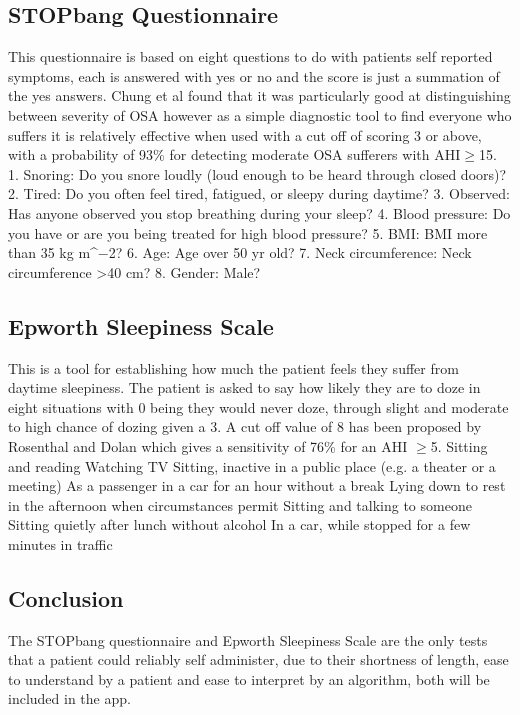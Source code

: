 \subsection{STOPbang Questionnaire}
This questionnaire is based on eight questions to do with patients self reported symptoms, each is answered with yes or no and the score is just a summation of the yes answers. Chung et al found that it was particularly good at distinguishing between severity of OSA however as a simple diagnostic tool to find everyone who suffers it is relatively effective when used with a cut off of scoring 3 or above, with a probability of 93\% for detecting moderate OSA sufferers with AHI$\geq$15.
1. Snoring: Do you snore loudly (loud enough to be heard through closed doors)?
2. Tired: Do you often feel tired, fatigued, or sleepy during daytime?
3. Observed: Has anyone observed you stop breathing during your sleep?
4. Blood pressure: Do you have or are you being treated for high blood pressure?
5. BMI: BMI more than 35 kg m^{−2}?
6. Age: Age over 50 yr old?
7. Neck circumference: Neck circumference >40 cm?
8. Gender: Male?

\subsection{Epworth Sleepiness Scale}
This is a tool for establishing how much the patient feels they suffer from daytime sleepiness. The patient is asked to say how likely they are to doze in eight situations with 0 being they would never doze, through slight and moderate to high chance of dozing given a 3. A cut off value of 8 has been proposed by Rosenthal and Dolan which gives a sensitivity of 76\% for an AHI $\geq$5. 
Sitting and reading
Watching TV
Sitting, inactive in a public place (e.g. a theater or a meeting)
As a passenger in a car for an hour without a break
Lying down to rest in the afternoon when circumstances permit
Sitting and talking to someone
Sitting quietly after lunch without alcohol
In a car, while stopped for a few minutes in traffic
\subsection{Conclusion}
The STOPbang questionnaire and Epworth Sleepiness Scale are the only tests that a patient could reliably self administer, due to their shortness of length, ease to understand by a patient and ease to interpret by an algorithm, both will be included in the app.
